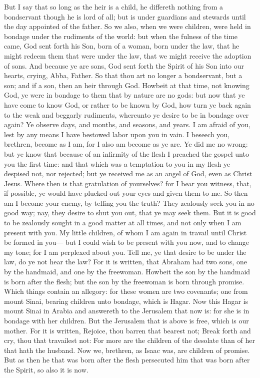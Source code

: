 But I say that so long as the heir is a child, he differeth nothing from a bondservant though he is lord of all; but is under guardians and stewards until the day appointed of the father. So we also, when we were children, were held in bondage under the rudiments of the world: but when the fulness of the time came, God sent forth his Son, born of a woman, born under the law, that he might redeem them that were under the law, that we might receive the adoption of sons. And because ye are sons, God sent forth the Spirit of his Son into our hearts, crying, Abba, Father. So that thou art no longer a bondservant, but a son; and if a son, then an heir through God.  Howbeit at that time, not knowing God, ye were in bondage to them that by nature are no gods: but now that ye have come to know God, or rather to be known by God, how turn ye back again to the weak and beggarly rudiments, whereunto ye desire to be in bondage over again? Ye observe days, and months, and seasons, and years. I am afraid of you, lest by any means I have bestowed labor upon you in vain.  I beseech you, brethren, become as I am, for I also am become as ye are. Ye did me no wrong: but ye know that because of an infirmity of the flesh I preached the gospel unto you the first time: and that which was a temptation to you in my flesh ye despised not, nor rejected; but ye received me as an angel of God, even as Christ Jesus. Where then is that gratulation of yourselves? for I bear you witness, that, if possible, ye would have plucked out your eyes and given them to me. So then am I become your enemy, by telling you the truth? They zealously seek you in no good way; nay, they desire to shut you out, that ye may seek them. But it is good to be zealously sought in a good matter at all times, and not only when I am present with you. My little children, of whom I am again in travail until Christ be formed in you— but I could wish to be present with you now, and to change my tone; for I am perplexed about you.  Tell me, ye that desire to be under the law, do ye not hear the law? For it is written, that Abraham had two sons, one by the handmaid, and one by the freewoman. Howbeit the son by the handmaid is born after the flesh; but the son by the freewoman is born through promise. Which things contain an allegory: for these women are two covenants; one from mount Sinai, bearing children unto bondage, which is Hagar. Now this Hagar is mount Sinai in Arabia and answereth to the Jerusalem that now is: for she is in bondage with her children. But the Jerusalem that is above is free, which is our mother. For it is written, Rejoice, thou barren that bearest not; Break forth and cry, thou that travailest not: For more are the children of the desolate than of her that hath the husband.  Now we, brethren, as Isaac was, are children of promise. But as then he that was born after the flesh persecuted him that was born after the Spirit, so also it is now. 